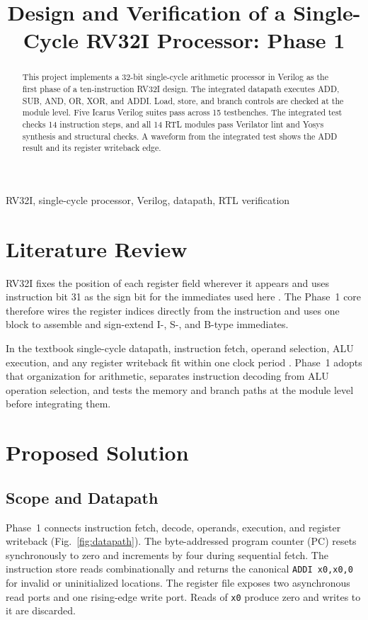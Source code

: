 \documentclass[conference,letterpaper]{IEEEtran}
\newcommand{\insn}[1]{\texttt{#1}}
\begin{document}
\title{Design and Verification of a Single-Cycle RV32I Processor: Phase 1}
\author{
}
\maketitle

\begin{abstract}
This project implements a 32-bit single-cycle arithmetic processor in Verilog as the first phase of a ten-instruction RV32I design. The integrated datapath executes ADD, SUB, AND, OR, XOR, and ADDI. Load, store, and branch controls are checked at the module level. Five Icarus Verilog suites pass across 15 testbenches. The integrated test checks 14 instruction steps, and all 14 RTL modules pass Verilator lint and Yosys synthesis and structural checks. A waveform from the integrated test shows the ADD result and its register writeback edge.
\end{abstract}

\begin{IEEEkeywords}
RV32I, single-cycle processor, Verilog, datapath, RTL verification
\end{IEEEkeywords}

\section{Literature Review}
RV32I fixes the position of each register field wherever it appears and uses instruction bit 31 as the sign bit for the immediates used here \cite{rv32i}. The Phase~1 core therefore wires the register indices directly from the instruction and uses one block to assemble and sign-extend I-, S-, and B-type immediates.

In the textbook single-cycle datapath, instruction fetch, operand selection, ALU execution, and any register writeback fit within one clock period \cite{cod,ddca}. Phase~1 adopts that organization for arithmetic, separates instruction decoding from ALU operation selection, and tests the memory and branch paths at the module level before integrating them.

\section{Proposed Solution}
\subsection{Scope and Datapath}
Phase~1 connects instruction fetch, decode, operands, execution, and register writeback (Fig.~\ref{fig:datapath}). The byte-addressed program counter (PC) resets synchronously to zero and increments by four during sequential fetch. The instruction store reads combinationally and returns the canonical \insn{ADDI x0,x0,0} for invalid or uninitialized locations. The register file exposes two asynchronous read ports and one rising-edge write port. Reads of \insn{x0} produce zero and writes to it are discarded.
\end{document}
